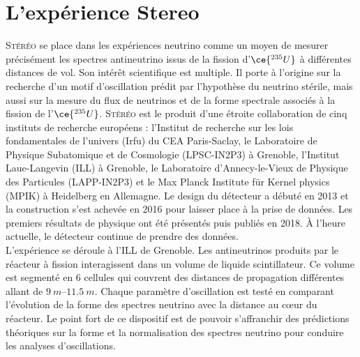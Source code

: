 

\chapter{L'expérience Stereo} 
\label{chap:chapitre_2} 


\minitoc 

\newpage 

\textsc{Stéréo} se place dans les expériences neutrino comme un moyen de mesurer précisément les spectres antineutrino issus de la fission d'$\ce{^{235}U}$ à différentes distances de vol. Son intérêt scientifique est multiple. Il porte à l'origine sur la recherche d'un motif d'oscillation prédit par l'hypothèse du neutrino stérile, mais aussi sur la mesure du flux de neutrinos et de la forme spectrale associés à la fission de l'$\ce{^{235}U}$. \textsc{Stéréo} est le produit d'une étroite collaboration de cinq instituts de recherche européens : l'\og Institut de recherche sur les lois fondamentales de l'univers \fg{} (Irfu) du CEA Paris-Saclay, le \og Laboratoire de Physique Subatomique et de Cosmologie \fg{} (LPSC-IN2P3) à Grenoble, l’\og Institut Laue-Langevin \fg{} (ILL) à Grenoble, le \og Laboratoire d’Annecy-le-Vieux de Physique des Particules \fg{} (LAPP-IN2P3) et le \og Max Planck Institute f\"ur Kernel physics \fg{} (MPIK) à Heidelberg en Allemagne. Le design du détecteur a débuté en 2013 et la construction s'est achevée en 2016 pour laisser place à la prise de données. Les premiers résultats de physique ont été présentés puis publiés en 2018. \`A l'heure actuelle, le détecteur continue de prendre des données.\\ 

L'expérience se déroule à l'ILL de Grenoble. Les antineutrinos produits par le réacteur à fission interagissent dans un volume de liquide scintillateur. Ce volume est segmenté en 6 cellules qui couvrent des distances de propagation différentes allant de $\SIrange{9}{11,5}{m}$. Chaque paramètre d'oscillation est testé en comparant l'évolution de la forme des spectres neutrino avec la distance au c\oe ur du réacteur. Le point fort de ce dispositif est de pouvoir s'affranchir des prédictions théoriques sur la forme et la normalisation des spectres neutrino pour conduire les analyses d'oscillations.\\ 

